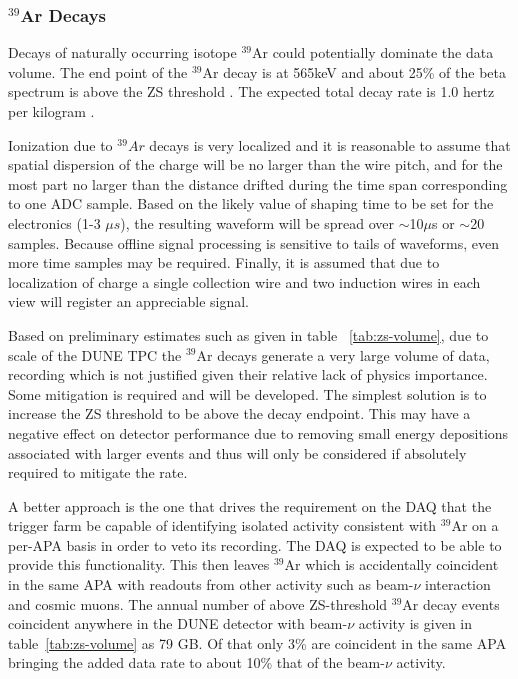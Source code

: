 \subsubsection{$^{39}$Ar Decays}
\label{sec:ar39decays}
Decays of naturally occurring isotope $^{39}$Ar could potentially dominate the data volume.
The end point of the $^{39}$Ar decay is at 565keV and about
25\% of the beta spectrum is above the ZS threshold \cite{ar39endpoint}.
The expected total decay rate is 1.0 hertz per kilogram \cite{ar39bkg}.

Ionization due to $^{39}Ar$ decays is very localized and it is reasonable to assume
that spatial dispersion of the charge will be no larger than the wire pitch,
and for the most part no larger than the distance drifted during the time span
corresponding to one ADC sample.
Based on the likely value of shaping time to be set for the electronics (1-3 ${\mu}s$),
the resulting waveform will be spread over $\sim$10$\mu$s or $\sim$20 samples. Because offline signal
processing is sensitive to tails of waveforms, even more time samples may be required.
Finally, it is assumed that due to localization of charge a single collection wire and two induction
wires in each view will register an appreciable signal.

Based on preliminary estimates such as given in table ~\ref{tab:zs-volume},
due to scale of the DUNE TPC the $^{39}$Ar decays generate a very large volume of data, recording which
is not justified given their relative lack of physics importance.
Some mitigation is required and will be developed. The simplest solution is to increase the ZS
threshold to be above the decay endpoint.
This may have a negative effect on detector performance due to removing small energy
depositions associated with larger events and thus will only be
considered if absolutely required to mitigate the rate.

A better approach is the one that drives the requirement on the DAQ
that the trigger farm be capable of identifying isolated activity
consistent with $^{39}$Ar on a per-APA basis in order to veto its
recording. The DAQ is expected to be able to provide this functionality.
This then leaves $^{39}$Ar which is accidentally coincident in the
same APA with readouts from other activity such as beam-$\nu$
interaction and cosmic muons.
The annual number of above ZS-threshold $^{39}$Ar decay events
coincident anywhere in the DUNE detector with beam-$\nu$ activity is
given in table~\ref{tab:zs-volume} as 79 GB. Of that only 3\% are coincident
in the same APA bringing the added data rate to about 10\% that of the beam-$\nu$ activity.

